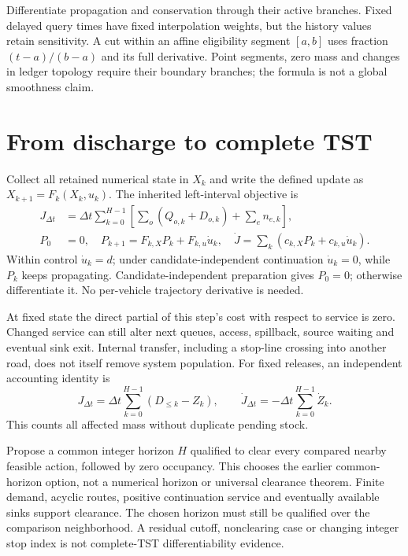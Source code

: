 \documentclass[10pt,a4paper]{article}
\begin{document}
Differentiate propagation and conservation through their active branches.
Fixed delayed query times have fixed interpolation weights, but the history
values retain sensitivity. A cut within an affine eligibility segment
$[a,b]$ uses fraction $(t-a)/(b-a)$ and its full derivative. Point segments,
zero mass and changes in ledger topology require their boundary branches;
the formula is not a global smoothness claim.

\section{From discharge to complete TST}

Collect all retained numerical state in $X_k$ and write the defined update as
$X_{k+1}=F_k(X_k,u_k)$. The inherited left-interval objective is
\begin{align}
 J_{\Delta t}&=\Delta t\sum_{k=0}^{H-1}
       \left[\sum_o(Q_{o,k}+D_{o,k})+\sum_en_{e,k}\right],
 \label{eq:tst-new}\\
 P_0&=0,\quad P_{k+1}=F_{k,X}P_k+F_{k,u}\dot u_k,\quad
 \dot J=\sum_k(c_{k,X}P_k+c_{k,u}\dot u_k).
 \label{eq:chain-new}
\end{align}
Within control $\dot u_k=d$; under candidate-independent continuation
$\dot u_k=0$, while $P_k$ keeps propagating.
Candidate-independent preparation gives $P_0=0$; otherwise differentiate it.
No per-vehicle trajectory derivative is needed.

At fixed state the direct partial of this step's cost with respect to service
is zero. Changed service can still alter next queues, access, spillback,
source waiting and eventual sink exit. Internal transfer, including a
stop-line crossing into another road, does not itself remove system population.
For fixed releases, an independent accounting identity is
\begin{equation}
 J_{\Delta t}=\Delta t\sum_{k=0}^{H-1}(D_{\leq k}-Z_k),\qquad
 \dot J_{\Delta t}=-\Delta t\sum_{k=0}^{H-1}\dot Z_k.
 \label{eq:tst-exit-new}
\end{equation}
This counts all affected mass without duplicate pending stock.

Propose a common integer horizon $H$ qualified to clear every compared
nearby feasible action, followed by zero occupancy. This chooses the earlier
common-horizon option, not a numerical horizon or universal clearance
theorem. Finite demand, acyclic routes, positive continuation service and
eventually available sinks support clearance. The chosen horizon must still
be qualified over the comparison neighborhood. A residual cutoff,
nonclearing case or changing integer stop index is not complete-TST
differentiability evidence.
\end{document}
